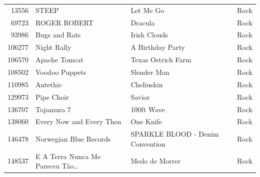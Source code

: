 \begin{footnotesize}
\begin{longtable}{@{}rlll@{}}
13556 & STEEP & Let Me Go & Rock \\
69723 & ROGER ROBERT & Dracula & Rock \\
93986 & Bugs and Rats & Irish Clouds & Rock \\
106277 & Night Rally & A Birthday Party & Rock \\
106570 & Apache Tomcat & Texas Ostrich Farm & Rock \\
108502 & Voodoo Puppets & Slender Man & Rock \\
110985 & Antethic & Cheliuskin & Rock \\
129973 & Pipe Choir & Savior & Rock \\
136707 & Tojamura 7 & 100ft Wave & Rock \\
138060 & Every Now and Every Then & One Knife & Rock \\
146478 & Norwegian Blue Records & SPARKLE BLOOD - Denim Convention & Rock \\
148537 & E A Terra Nunca Me Pareceu Tão\ldots & Medo de Morrer & Rock \\
\end{longtable}
\end{footnotesize}
